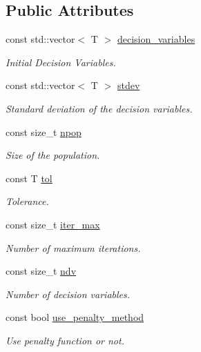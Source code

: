 \subsection*{Public Attributes}
\begin{DoxyCompactItemize}
\item 
const std\+::vector$<$ T $>$ \hyperlink{structea_1_1_e_a__base_a71e09437e78efc6e93e0a6e510d13100}{decision\+\_\+variables}
\begin{DoxyCompactList}\small\item\em Initial Decision Variables. \end{DoxyCompactList}\item 
const std\+::vector$<$ T $>$ \hyperlink{structea_1_1_e_a__base_a28216728d1e1355337d8bf2a484d5569}{stdev}
\begin{DoxyCompactList}\small\item\em Standard deviation of the decision variables. \end{DoxyCompactList}\item 
const size\+\_\+t \hyperlink{structea_1_1_e_a__base_a41b6ed30e866d5f6a782a90e6a1b0f79}{npop}
\begin{DoxyCompactList}\small\item\em Size of the population. \end{DoxyCompactList}\item 
const T \hyperlink{structea_1_1_e_a__base_a9b7a33797adc1cbeab7a9f3786c41a27}{tol}
\begin{DoxyCompactList}\small\item\em Tolerance. \end{DoxyCompactList}\item 
const size\+\_\+t \hyperlink{structea_1_1_e_a__base_affe85fad1da440e091a9d09cf46d502f}{iter\+\_\+max}
\begin{DoxyCompactList}\small\item\em Number of maximum iterations. \end{DoxyCompactList}\item 
const size\+\_\+t \hyperlink{structea_1_1_e_a__base_a6996abed1c0b9642bdae67547fa6474c}{ndv}
\begin{DoxyCompactList}\small\item\em Number of decision variables. \end{DoxyCompactList}\item 
const bool \hyperlink{structea_1_1_e_a__base_ad3b4a962208b72c67b663ba0d40bebfb}{use\+\_\+penalty\+\_\+method}
\begin{DoxyCompactList}\small\item\em Use penalty function or not. \end{DoxyCompactList}\item 

\end{DoxyCompactItemize}
